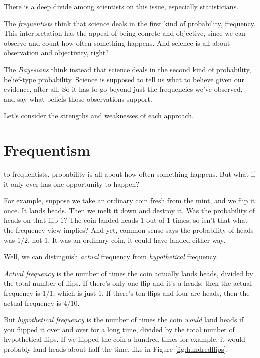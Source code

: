 \documentclass[justified]{tufte-book}
\theoremstyle{definition}
\theoremstyle{definition}
\theoremstyle{definition}
\theoremstyle{remark}
\begin{document}
There is a deep divide among scientists on this issue, especially
statisticians.

The \emph{frequentists} think that science deals in the first kind of
probability, frequency. This interpretation has the appeal of being
conrete and objective, since we can observe and count how often
something happens. And science is all about observation and objectivity,
right?

The \emph{Bayesians} think instead that science deals in the second kind
of probability, belief-type probability. Science is supposed to tell us
what to believe given our evidence, after all. So it has to go beyond
just the frequencies we've observed, and say what beliefs those
observations support.

Let's consider the strengths and weaknesses of each approach.

\hypertarget{frequentism}{%
\section{Frequentism}\label{frequentism}}

 to frequentists, probability is all about how
often something happens. But what if it only ever has one opportunity to
happen?

For example, suppose we take an ordinary coin fresh from the mint, and
we flip it once. It lands heads. Then we melt it down and destroy it.
Was the probability of heads on that flip \(1\)? The coin landed heads
\(1\) out of \(1\) times, so isn't that what the frequency view implies?
And yet, common sense says the probability of heads was \(1/2\), not
\(1\). It was an ordinary coin, it could have landed either way.

Well, we can distinguish \emph{actual} frequency from
\emph{hypothetical} frequency.

\emph{Actual frequency} is the number of times the coin actually lands
heads, divided by the total number of flips. If there's only one flip
and it's a heads, then the actual frequency is \(1/1\), which is just
\(1\). If there's ten flips and four are heads, then the actual
frequency is \(4/10\).

But \emph{hypothetical frequency} is the number of times the coin
\emph{would} land heads if you flipped it over and over for a long time,
divided by the total number of hypothetical flips. If we flipped the
coin a hundred times for example, it would probably land heads about
half the time, like in Figure \ref{fig:hundredflips}.
\end{document}
